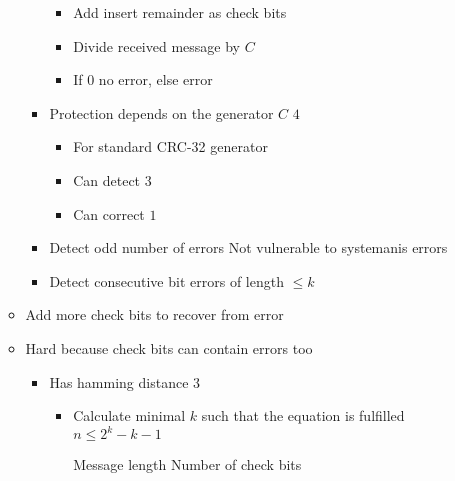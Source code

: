 \begin{itemize}
\begin{itemize}
\begin{itemize}
\begin{itemize}
                            \item Add insert remainder as check bits
                        \end{itemize}
                        \begin{itemize}
                            \item Divide received message by $C$
                            \item If $0$ no error, else error
                        \end{itemize}
                    \item Protection depends on the generator $C$
                     $4$
                        \begin{itemize}
                            \item For standard CRC-32 generator
                            \item Can detect $3$
                            \item Can correct $1$
                        \end{itemize}
                    \item Detect odd number of errors
                    \ipro Not vulnerable to systemanis errors
                    \item Detect consecutive bit errors of length $\le k$
                \end{itemize}
        \end{itemize}
        \begin{itemize}
            \item Add more check bits to recover from error
            \item Hard because check bits can contain errors too
                \begin{itemize}
                    \item Has hamming distance $3$
                        \begin{itemize}
                            \item Calculate minimal $k$ such that the equation is fulfilled $n \le 2^k - k - 1$
                                \begin{itemize}
                                     Message length
                                     Number of check bits
                                \end{itemize}

\end{itemize}
\end{itemize}
\end{itemize}
\end{itemize}

